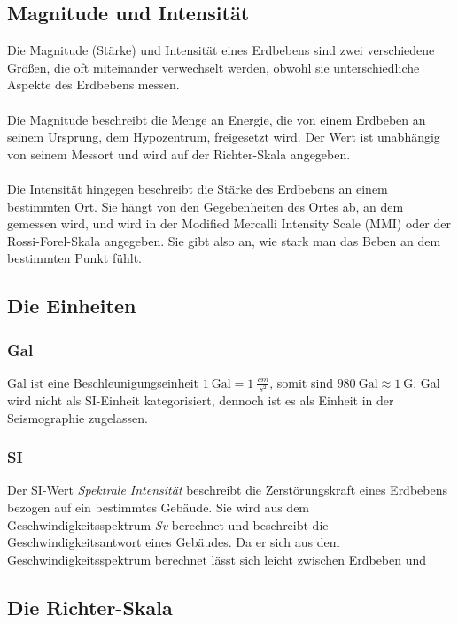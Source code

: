 \documentclass[class=scrbook, crop=false]{standalone}
\begin{document}
\subsection{Magnitude und Intensität}
Die Magnitude (Stärke) und Intensität eines Erdbebens sind zwei verschiedene Größen, die oft miteinander verwechselt werden, obwohl sie unterschiedliche Aspekte des Erdbebens messen. \\
\\
Die Magnitude beschreibt die Menge an Energie, die von einem Erdbeben an seinem Ursprung, dem Hypozentrum, freigesetzt wird. Der Wert ist unabhängig von seinem Messort und wird auf der Richter-Skala angegeben.\\
\\
Die Intensität hingegen beschreibt die Stärke des Erdbebens an einem bestimmten Ort. Sie hängt von den Gegebenheiten des Ortes ab, an dem gemessen wird, und wird in der Modified Mercalli Intensity Scale (MMI) oder der Rossi-Forel-Skala angegeben. Sie gibt also an, wie stark man das Beben an dem bestimmten Punkt fühlt.

\subsection{Die Einheiten}
\subsubsection{Gal}
Gal ist eine Beschleunigungseinheit $1~\mathrm{Gal} = 1~\frac{cm}{s^2}$, somit sind $ 980 ~\mathrm{Gal} \approx 1~\mathrm{G}$. Gal wird nicht als SI-Einheit kategorisiert, dennoch ist es als Einheit in der Seismographie zugelassen.

\subsubsection{SI}
Der SI-Wert \textit{Spektrale Intensität} beschreibt die Zerstörungskraft eines Erdbebens bezogen auf ein bestimmtes Gebäude. Sie wird aus dem Geschwindigkeitsspektrum \textit{Sv} berechnet und beschreibt die Geschwindigkeitsantwort eines Gebäudes.  Da er sich aus dem Geschwindigkeitsspektrum berechnet lässt sich leicht zwischen Erdbeben und 

\subsection{Die Richter-Skala}

\ifstandalone
    \printbibliography[heading=bibintoc]                         
    \cleardoublepage
\end{document}
